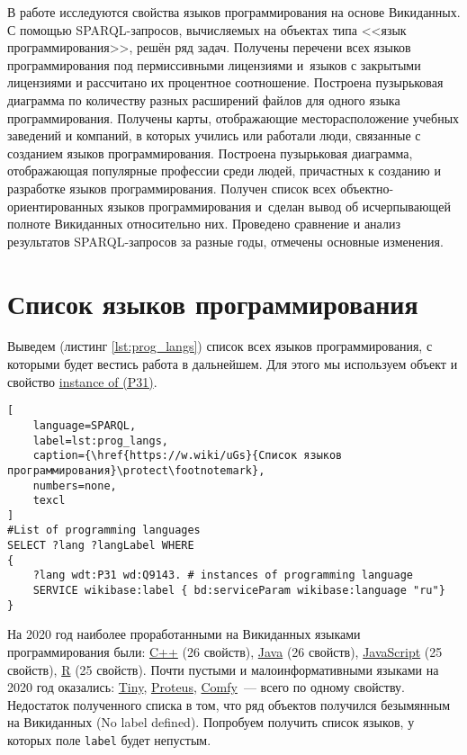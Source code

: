 В работе исследуются свойства языков программирования на основе Викиданных. 
С помощью SPARQL-запросов, вычисляемых на объектах типа <<язык программирования>>, решён ряд задач. 
Получены перечени всех языков программирования под пермиссивными лицензиями 
и~языков с закрытыми лицензиями и рассчитано их процентное соотношение. 
Построена пузырьковая диаграмма по количеству разных расширений файлов для одного языка программирования. 
Получены карты, отображающие месторасположение учебных заведений и компаний, 
в которых учились или работали люди, связанные с созданием языков программирования. 
Построена пузырьковая диаграмма, отображающая популярные профессии среди людей, 
причастных к созданию и разработке языков программирования. 
Получен список всех объектно-ориентированных языков программирования 
и~сделан вывод об исчерпывающей полноте Викиданных относительно них. 
Проведено сравнение и анализ результатов SPARQL-запросов за разные годы, отмечены основные изменения. 




\newpage
\section{Список языков программирования}
Выведем (листинг \ref{lst:prog_langs}) список всех языков программирования, с которыми будет вестись работа в дальнейшем. Для этого мы используем объект  и свойство \href{https://www.wikidata.org/wiki/Property:P31}{instance of (P31)}.

\begin{lstlisting}[
	language=SPARQL,
	label=lst:prog_langs,
	caption={\href{https://w.wiki/uGs}{Список языков программирования}\protect\footnotemark},
    numbers=none,
	texcl 
]
#List of programming languages
SELECT ?lang ?langLabel WHERE
{
    ?lang wdt:P31 wd:Q9143. # instances of programming language
    SERVICE wikibase:label { bd:serviceParam wikibase:language "ru"}
}
\end{lstlisting}

На 2020 год наиболее проработанными на Викиданных языками программирования были: \href{https://www.wikidata.org/wiki/Q2407}{C++} (26 свойств), \href{https://www.wikidata.org/wiki/Q251}{Java} (26 свойств), \href{https://www.wikidata.org/wiki/Q2005}{JavaScript} (25 свойств), \href{https://www.wikidata.org/wiki/Q206904}{R} (25 свойств).
Почти пустыми и малоинформативными языками на 2020 год оказались\autocite{prowd_langs_link}: 
\href{https://www.wikidata.org/wiki/Q3991643}{Tiny}, 
\href{https://www.wikidata.org/wiki/Q3924253}{Proteus}, 
\href{https://www.wikidata.org/wiki/Q21524853}{Comfy}~--- всего по одному свойству.
Недостаток полученного списка в том, 
что ряд объектов получился безымянным на Викиданных (No label defined). 
Попробуем получить список языков, у которых поле \lstinline|label| будет непустым.

